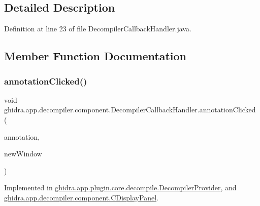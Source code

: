 \subsection{Detailed Description}


Definition at line 23 of file Decompiler\+Callback\+Handler.\+java.



\subsection{Member Function Documentation}
\mbox{\label{interfaceghidra_1_1app_1_1decompiler_1_1component_1_1_decompiler_callback_handler_a9b7c60460fed31e218b66a0493b43826}} 
\subsubsection{\texorpdfstring{annotationClicked()}{annotationClicked()}}
{\footnotesize\ttfamily void ghidra.\+app.\+decompiler.\+component.\+Decompiler\+Callback\+Handler.\+annotation\+Clicked (\begin{DoxyParamCaption}\item[{Annotated\+Text\+Field\+Element}]{annotation,  }\item[{boolean}]{new\+Window }\end{DoxyParamCaption})}



Implemented in \mbox{\hyperlink{classghidra_1_1app_1_1plugin_1_1core_1_1decompile_1_1_decompiler_provider_a846c46957aac9b31e7fcb6fa8566f0fb}{ghidra.\+app.\+plugin.\+core.\+decompile.\+Decompiler\+Provider}}, and \mbox{\hyperlink{classghidra_1_1app_1_1decompiler_1_1component_1_1_c_display_panel_a8097a7e856b8595897a2709790ebd66f}{ghidra.\+app.\+decompiler.\+component.\+C\+Display\+Panel}}.

\mbox{\label{interfaceghidra_1_1app_1_1decompiler_1_1component_1_1_decompiler_callback_handler_ae908ba10bddcb8d863eae48d8f1887a0}} 
